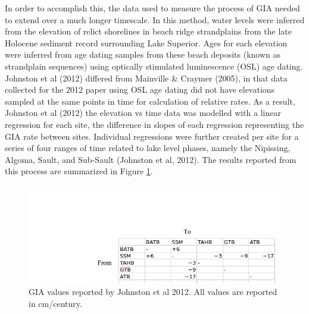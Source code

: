 In order to accomplish this, the data used to measure the process of
 GIA needed to extend over a much longer timescale. In this method, water
 levels were inferred from the elevation of relict shorelines in beach ridge
 strandplains from the late Holocene sediment record surrounding Lake Superior.
 Ages for each elevation were inferred from age dating samples from these beach
 deposits (known as strandplain sequences) using
 optically stimulated luminescence (OSL) age dating. Johnston et al (2012) differed from
 Mainville \& Craymer (2005), in that data collected for the 2012 paper using OSL
 age dating did not have
 elevations sampled at the same points in time for calculation of relative
 rates. As a result, Johnston et al (2012) the elevation vs time data was modelled with a linear
 regression for each site, the difference in slopes of each regression representing the GIA rate
 between sites. Individual regressions were further created per site
 for a series of four ranges of time related to lake level phases, namely the Nipissing,
 Algoma, Sault, and Sub-Sault (Johnston et al, 2012). The results reported from this process
 are summarized in Figure \ref{fig:jj2012Grid}. \\
 
 \begin{figure}[t]
	\includegraphics[width=0.9\linewidth]{jjGrid.png}
	\caption{GIA values reported by Johnston et al 2012. All values are reported in cm/century.}
	\label{fig:jj2012Grid}
 \end{figure}
 
